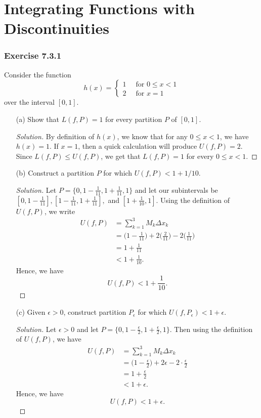 \section{Integrating Functions with Discontinuities}

\subsubsection{Exercise 7.3.1} Consider the function 
\[  h(x) = 
\begin{cases}
	1 \ &\text{ for } 0 \leq x < 1 \\
	2 \ &\text{ for } x = 1 
\end{cases} \]
over the interval \( [0,1]  \).
\begin{enumerate}
	\item[(a)] Show that \( L(f,P) = 1  \) for every partition \( P  \) of \( [0,1] \).
		\begin{proof}[Solution]
		By definition of \( h(x)  \), we know that for any \( 0 \leq x < 1  \), we have \( h(x) = 1  \). If \( x = 1  \), then a quick calculation will produce \( U(f, P) = 2  \). Since \( L(f,P) \leq U(f,P)  \), we get that \( L(f,P) = 1  \) for every \( 0 \leq x < 1  \).
		\end{proof}
	\item[(b)] Construct a partition \( P  \) for which \( U(f,P) < 1 + 1/ 10 \).
		\begin{proof}[Solution]
			Let \( P = \{ 0,  1 - \frac{ 1 }{ 11 }, 1 + \frac{ 1 }{ 11 },  1 \}  \)
			and let our subintervals be \( [0, 1 - \frac{ 1 }{ 11 } ], [1 - \frac{ 1 }{ 11 }, 1 + \frac{ 1 }{ 11 } ], \) and  \( [1 + \frac{ 1 }{ 10 }, 1] \). Using the definition of \( U(f,P)  \), we write 
			\begin{align*}
				U(f,P) &= \sum_{ k=1 }^{ 3 } M_{k } \Delta x_{k }   \\
					   &= \Big( 1 - \frac{ 1 }{ 11 }  \Big) + 2 \Big( \frac{ 2 }{ 11 }  \Big) - 2 \Big( \frac{ 1 }{ 11 }  \Big) \\
					   &= 1 + \frac{ 1 }{ 11 } \\
					   &< 1 + \frac{ 1 }{ 10 }. 
			\end{align*}
			Hence, we have 
			\[  U(f,P) < 1 + \frac{ 1 }{ 10 }. \]
		\end{proof}
	\item[(c)] Given \( \epsilon > 0  \), construct partition \( P_{\epsilon } \) for which \( U(f,P_{\epsilon }) < 1 + \epsilon \).
		\begin{proof}[Solution]
		Let \( \epsilon > 0  \) and let \( P = \{ 0, 1 - \frac{ \epsilon  }{ 2 } , 1 + \frac{ \epsilon  }{ 2 }, 1  \}  \). Then using the definition of \( U(f,P)  \), we have
		\begin{align*}
		    U(f,P) &= \sum_{ k=1 }^{ 3 } M_{k } \Delta x_{ k }  \\
				   &= \Big( 1 - \frac{ \epsilon  }{ 2 }  \Big) + 2 \epsilon - 2 \cdot \frac{ \epsilon  }{ 2 } \\
				   &= 1 + \frac{ \epsilon  }{ 2 } \\
				   &< 1 + \epsilon. 
		\end{align*}
		Hence, we have 
		\[ U(f,P) < 1 + \epsilon. \]


\end{proof}
\end{enumerate}
